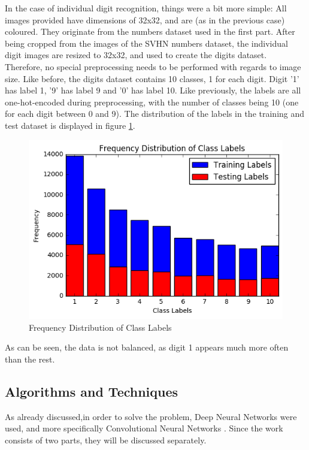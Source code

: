 \documentclass[final,12p,times]{elsarticle}
\begin{document}
\begin{Itemize}
In the case of individual digit recognition, things were a bit more simple:
All images provided have dimensions of 32x32, and are (as in the previous case) coloured.
They originate from the numbers dataset used in the first part.
After being cropped from the images of the SVHN numbers dataset, the individual digit images are resized to 32x32, and used to 
create the digits dataset.
Therefore, no special preprocessing needs to be performed with regards to image size.
Like before, the digits dataset contains 10 classes, 1 for each digit. 
Digit '1' has label 1, '9' has label 9 and '0' has label 10.
Like previously, the labels are all one-hot-encoded during preprocessing, with the number of classes being 10 (one for each 
digit between 0 and 9). 
The distribution of the labels in the training and test dataset is displayed in figure \ref{fig:Fig4.2}.

\begin{figure}[H]
  \includegraphics[width=1.0\textwidth, center]{distribution.png}
  \caption{Frequency Distribution of Class Labels}
  \label{fig:Fig4.2}
  \end{figure}
  
As can be seen, the data is not balanced, as digit 1 appears much more often than the rest.

\subsection{Algorithms and Techniques}
\label{sec:4.2}
As already discussed,in order to solve the problem, Deep Neural Networks were used, and more specifically 
Convolutional Neural Networks \cite{Fukushima1980} \cite{Lecun98gradient-basedlearning}.
Since the work consists of two parts, they will be discussed separately.


\end{Itemize}
\end{document}
